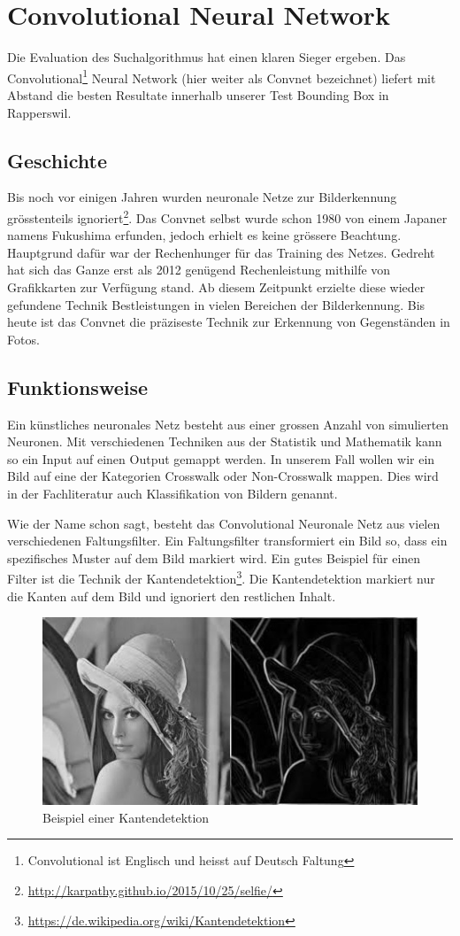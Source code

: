\section{Convolutional Neural Network}
Die Evaluation des Suchalgorithmus hat einen klaren Sieger ergeben. Das Convolutional\footnote{Convolutional ist Englisch und heisst auf Deutsch Faltung} Neural Network (hier weiter als Convnet bezeichnet) liefert mit Abstand die besten Resultate innerhalb unserer Test Bounding Box in Rapperswil.

\subsection{Geschichte}
Bis noch vor einigen Jahren wurden neuronale Netze zur Bilderkennung grösstenteils ignoriert\footnote{\url{http://karpathy.github.io/2015/10/25/selfie/}}. Das Convnet selbst wurde schon 1980 von einem Japaner namens Fukushima erfunden, jedoch erhielt es keine grössere Beachtung. Hauptgrund dafür war der Rechenhunger für das Training des Netzes. Gedreht hat sich das Ganze erst als 2012 genügend Rechenleistung mithilfe von Grafikkarten zur Verfügung stand. Ab diesem Zeitpunkt erzielte diese wieder gefundene Technik Bestleistungen in vielen Bereichen der Bilderkennung. Bis heute ist das Convnet die präziseste Technik zur Erkennung von Gegenständen in Fotos.

\subsection{Funktionsweise}
Ein künstliches neuronales Netz besteht aus einer grossen Anzahl von simulierten Neuronen. Mit verschiedenen Techniken aus der Statistik und  Mathematik kann so ein Input auf einen Output gemappt werden. In unserem Fall wollen wir ein Bild auf eine der Kategorien Crosswalk oder Non-Crosswalk mappen. Dies wird in der Fachliteratur auch Klassifikation von Bildern genannt.

Wie der Name schon sagt, besteht das Convolutional Neuronale Netz aus vielen verschiedenen Faltungsfilter. Ein Faltungsfilter transformiert ein Bild so, dass ein spezifisches Muster auf dem Bild markiert wird. Ein gutes Beispiel für einen Filter ist die Technik der Kantendetektion\footnote{\url{https://de.wikipedia.org/wiki/Kantendetektion}}. Die Kantendetektion markiert nur die Kanten auf dem Bild und ignoriert den restlichen Inhalt.

\begin{figure}[H]
	\centering
	\includegraphics{images/kantendetektion.jpg}
	\caption{Beispiel einer Kantendetektion}
\end{figure}

